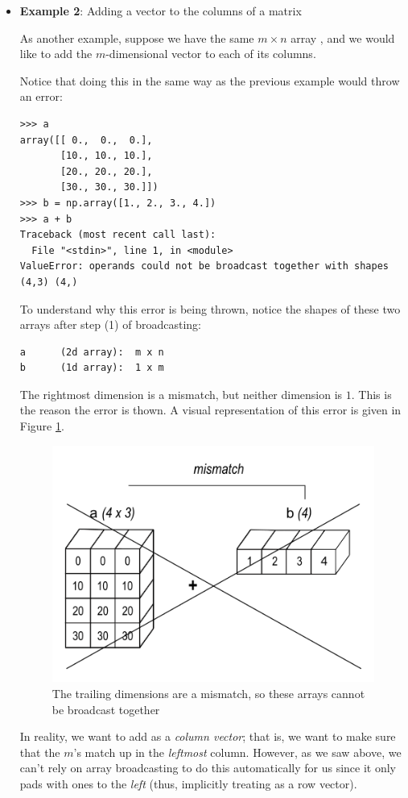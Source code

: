 \begin{itemize}
\item  \textbf{Example 2}: Adding a vector to the columns of a matrix

As another example, suppose we have the same $m \times n$ array , and we would like to add the $m$-dimensional vector  to each of its columns.

Notice that doing this in the same way as the previous example would throw an error:
\begin{lstlisting}
>>> a
array([[ 0.,  0.,  0.],
       [10., 10., 10.],
       [20., 20., 20.],
       [30., 30., 30.]])
>>> b = np.array([1., 2., 3., 4.])
>>> a + b
Traceback (most recent call last):
  File "<stdin>", line 1, in <module>
ValueError: operands could not be broadcast together with shapes (4,3) (4,)
\end{lstlisting}

To understand why this error is being thrown, notice the shapes of these two arrays after step (1) of broadcasting:
\begin{lstlisting}
a	   (2d array):  m x n 
b	   (1d array):  1 x m
\end{lstlisting}
The rightmost dimension is a mismatch, but neither dimension is $1$. This is the reason the error is thown. A visual representation of this error is given in Figure \ref{fig:broadcasting3}.

\begin{figure}[H]
    \includegraphics[width=.7\textwidth]{figures/broadcasting_mismatch.png}
    \caption{The trailing dimensions are a mismatch, so these arrays cannot be broadcast together}
    \label{fig:broadcasting3}
\end{figure}

In reality, we want to add  as a \emph{column vector}; that is, we want to make sure that the $m$'s match up in the \emph{leftmost} column. 
However, as we saw above, we can't rely on array broadcasting to do this automatically for us since it only pads with ones to the \emph{left} (thus, implicitly treating  as a row vector).


\end{itemize}
